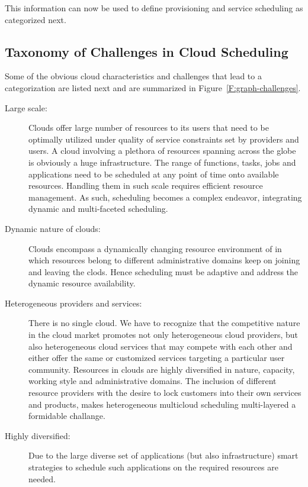 \documentclass[final,5p,times,twocolumn]{elsarticle}
\begin{document}


This information can now be used to define provisioning and service
scheduling as categorized next.

\subsection{Taxonomy of Challenges in Cloud Scheduling}\label{sec:challange}

Some of the obvious cloud characteristics and challenges that lead to
a categorization are listed next and are summarized in
Figure~\ref{F:graph-challenges}.

\begin{description}

\item [Large scale:] Clouds offer large number of resources to its
  users that need to be optimally utilized under quality of service
  constraints set by providers and users. A cloud involving a plethora
  of resources spanning across the globe is obviously a huge
  infrastructure. The range of functions, tasks, jobs and applications
  need to be scheduled at any point of time onto available resources.
  Handling them in such scale requires efficient resource management.
  As such, scheduling becomes a complex endeavor, integrating dynamic
  and multi-faceted scheduling. 
            
\item [Dynamic nature of clouds:] Clouds encompass a dynamically
  changing resource environment of in which resources belong to
  different administrative domains keep on joining and leaving the
  clods. Hence scheduling must be adaptive and address the dynamic
  resource availability.

\item[Heterogeneous providers and services:] There is no single cloud.
  We have to recognize that the competitive nature in the cloud
  market promotes not only heterogeneous cloud providers, but also
  heterogeneous cloud services that may compete with each other and
  either offer the same or customized services targeting a particular
  user community. Resources in clouds are highly
  diversified in nature, capacity, working style and administrative
  domains. The inclusion of different resource providers with the
  desire to lock customers into their own services and products, makes
  heterogeneous multicloud scheduling multi-layered a formidable challange.

\item [Highly diversified:] Due to the large diverse set of
  applications (but also infrastructure) smart strategies to schedule
  such applications on the required resources are needed.


\end{description}
\end{document}
